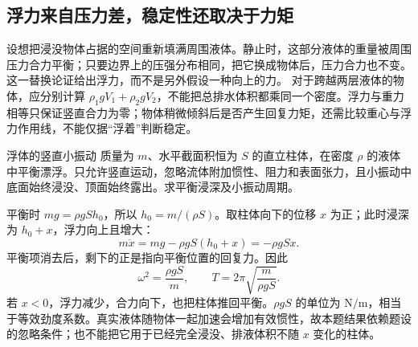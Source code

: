 \subsection{浮力来自压力差，稳定性还取决于力矩}
设想把浸没物体占据的空间重新填满周围液体。静止时，这部分液体的重量被周围压力合力平衡；只要边界上的压强分布相同，把它换成物体后，压力合力也不变。这一替换论证给出浮力，而不是另外假设一种向上的力。
对于跨越两层液体的物体，应分别计算 $\rho_1gV_1+\rho_2gV_2$，不能把总排水体积都乘同一个密度。浮力与重力相等只保证竖直合力为零；物体稍微倾斜后是否产生回复力矩，还需比较重心与浮力作用线，不能仅据“浮着”判断稳定。

\begin{origexamplebox}{浮体的竖直小振动}\label{ch13:ex:teaching-buoyancy}
质量为 $m$、水平截面积恒为 $S$ 的直立柱体，在密度 $\rho$ 的液体中平衡漂浮。只允许竖直运动，忽略流体附加惯性、阻力和表面张力，且小振动中底面始终浸没、顶面始终露出。求平衡浸深及小振动周期。
\end{origexamplebox}
\begin{xesolution}
平衡时 $mg=\rho gSh_0$，所以 $h_0=m/(\rho S)$。取柱体向下的位移 $x$ 为正；此时浸深为 $h_0+x$，浮力向上且增大：
\[
 m\ddot x=mg-\rho gS(h_0+x)=-\rho gSx.
\]
平衡项消去后，剩下的正是指向平衡位置的回复力。因此
\[
 \omega^2=\frac{\rho gS}{m},\qquad
 T=2\pi\sqrt{\frac{m}{\rho gS}}.
\]
若 $x<0$，浮力减少，合力向下，也把柱体推回平衡。$\rho gS$ 的单位为 $\mathrm{N/m}$，相当于等效劲度系数。真实液体随物体一起加速会增加有效惯性，故本题结果依赖题设的忽略条件；也不能把它用于已经完全浸没、排液体积不随 $x$ 变化的柱体。
\end{xesolution}
